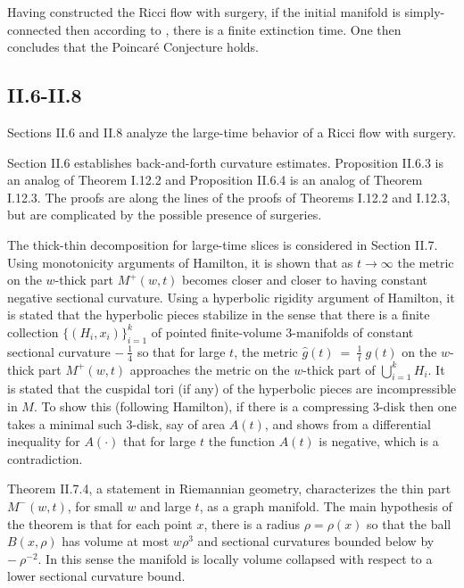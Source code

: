 Having constructed the Ricci flow with surgery, if the initial
manifold is simply-connected then according to
\cite{Colding-Minicozzi,Colding-Minicozzi2,Perelman3},
there is a finite extinction time.
One then concludes that the Poincar\'e Conjecture holds.


\subsection{II.6-II.8}

Sections II.6 and II.8 analyze the large-time behavior of a Ricci flow with
surgery.

Section II.6 establishes back-and-forth curvature estimates. Proposition
II.6.3 is an analog of Theorem I.12.2 and Proposition II.6.4 is an analog
of Theorem I.12.3.  The proofs are along the lines of the proofs of
Theorems I.12.2 and I.12.3, but are complicated by the possible presence
of surgeries.

The thick-thin decomposition for large-time slices is considered in
Section II.7. Using monotonicity arguments of Hamilton, it is
shown that as $t \rightarrow \infty$ the metric on the $w$-thick part $M^+(w,t)$
becomes closer and closer to having constant negative sectional
curvature. Using a hyperbolic rigidity argument of Hamilton, it is stated
that the hyperbolic pieces stabilize in the sense that
there is a finite collection $\{ (H_i, x_i) \}_{i=1}^k$ of
pointed finite-volume $3$-manifolds of constant sectional
curvature $- \: \frac14$ so that for large $t$, the metric
$\widehat{g}(t) \: = \: \frac{1}{t} \: g(t)$ on the $w$-thick part
$M^+(w,t)$ approaches the metric on the $w$-thick part
of $\bigcup_{i=1}^k H_i$. It is stated that the cuspidal tori (if any) of
the hyperbolic pieces  are incompressible in $M$. To show this
(following Hamilton), if there is a compressing $3$-disk then one
takes a minimal such $3$-disk, say of area $A(t)$, and shows from a
differential inequality for $A(\cdot)$ that for large $t$ the function
$A(t)$ is negative, which is a contradiction.

Theorem II.7.4, a statement in Riemannian geometry,
characterizes the thin part $M^-(w,t)$, for small $w$ and
large $t$, as a graph manifold.  The main hypothesis of the theorem
is that for each point $x$, there is a radius $\rho = \rho(x)$
so that the ball $B(x,\rho)$ has volume at most $w \rho^3$ and
sectional curvatures bounded below by $- \: \rho^{-2}$. In this
sense the manifold is locally volume collapsed with respect to a lower
sectional curvature bound.

